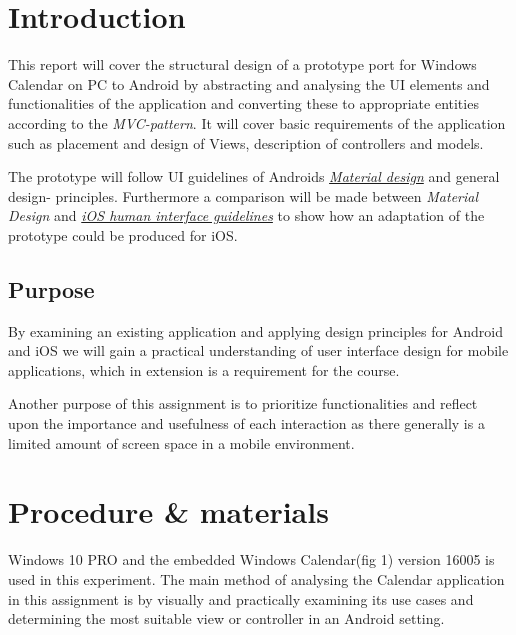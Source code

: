 \documentclass[]{article}
\begin{document}
\begin{flushleft}
\section{Introduction}

This report will cover the structural design of a prototype port for Windows Calendar on PC to Android by abstracting and analysing the UI elements and functionalities of the application and converting these to appropriate entities according to the \textit{MVC-pattern}. It will cover basic requirements of the application such as placement and design of Views, description of controllers and models.\medskip


The prototype will follow UI guidelines of Androids \textit{\href{https://material.io/design/}{Material design}} and general design- principles.
Furthermore a comparison will be made between \textit{Material Design} and \textit{\href{https://developer.apple.com/design/human-interface-guidelines/ios/overview/themes/}{iOS human interface guidelines}} to show how an adaptation of the prototype could be produced for iOS.

\subsection{Purpose}

By examining an existing application and applying design principles for Android and iOS we will gain a practical understanding of user interface design for mobile applications, which in extension is a requirement for the course\medskip.

Another purpose of this assignment is to prioritize functionalities and reflect upon the importance and usefulness of each interaction as there generally is a limited amount of screen space in a mobile environment.

\newpage
\section{Procedure \& materials}

Windows 10 PRO and the embedded Windows Calendar(fig 1) version 16005 is used in this experiment.\newline
The main method of analysing the Calendar application in this assignment is by visually and practically examining its use cases and determining the most suitable view or controller in an Android setting.


\end{flushleft}
\end{document}
